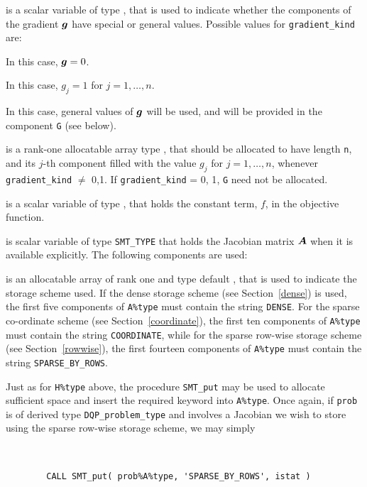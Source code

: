 \documentclass{galahad}
\newcommand{\packagename}{DQP}
\begin{document}
\begin{description}
 is a scalar variable of type \integer,
that is used to indicate whether the components of the gradient ${\bm{g}}$
have special or general values. Possible values for {\tt gradient\_kind} are:
\begin{description}
  In this case, ${\bm{g}} = 0$.

 In this case, $g_{j} = 1$ for $j = 1, \ldots , n$.

 In this case, general values of ${\bm{g}}$ will be used,
     and will be provided in the component {\tt G} (see below).
\end{description}

 is a rank-one allocatable array type \realdp, that
should be allocated to have length {\tt n}, and its $j$-th component
filled with the value $g_{j}$ for $j = 1, \ldots , n$,
whenever {\tt gradient\_kind} $\neq$ 0,1.
If {\tt gradient\_kind} {= 0, 1}, {\tt G} need not be allocated.

 is a scalar variable of type
\realdp, that holds
the constant term, $f$, in the objective function.

 is scalar variable of type {\tt SMT\_TYPE}
that holds the Jacobian matrix ${\bm{A}}$ when it is available explicitly.
The following components are used:

\begin{description}

 is an allocatable array of rank one and type default \character,
that is used to indicate the storage scheme used. If the dense storage scheme
(see Section~\ref{dense}) is used,
the first five components of {\tt A\%type} must contain the
string {\tt DENSE}.
For the sparse co-ordinate scheme (see Section~\ref{coordinate}),
the first ten components of {\tt A\%type} must contain the
string {\tt COORDINATE}, while
for the sparse row-wise storage scheme (see Section~\ref{rowwise}),
the first fourteen components of {\tt A\%type} must contain the
string {\tt SPARSE\_BY\_ROWS}.

Just as for {\tt H\%type} above, the procedure {\tt SMT\_put}
may be used to allocate sufficient space and insert the required keyword
into {\tt A\%type}.
Once again, if {\tt prob} is of derived type {\tt \packagename\_problem\_type}
and involves a Jacobian we wish to store using the sparse row-wise
storage scheme, we may simply
{\tt
\begin{verbatim}
        CALL SMT_put( prob%A%type, 'SPARSE_BY_ROWS', istat )
\end{verbatim}
}
\noindent


\end{description}
\end{description}
\end{document}
